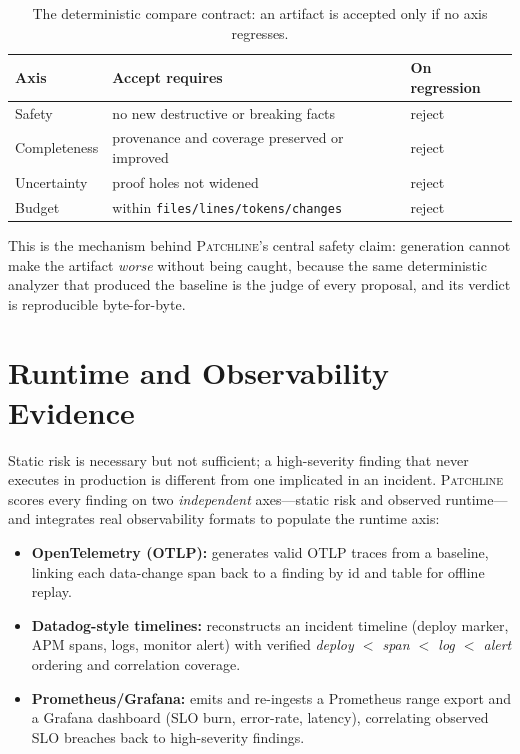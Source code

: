 \documentclass[11pt]{article}
\newcommand{\tool}{\textsc{Patchline}}
\newcommand{\code}[1]{\texttt{#1}}
\begin{document}
\begin{table}[h]\centering\small
\caption{The deterministic compare contract: an artifact is accepted only if no axis regresses.}
\label{tab:compare}
\begin{tabular}{>{\raggedright\arraybackslash}p{3.2cm}>{\raggedright\arraybackslash}p{6.4cm}>{\raggedright\arraybackslash}p{3.4cm}}
\toprule
\textbf{Axis} & \textbf{Accept requires} & \textbf{On regression} \\
\midrule
Safety & no new destructive or breaking facts & reject \\
Completeness & provenance and coverage preserved or improved & reject \\
Uncertainty & proof holes not widened & reject \\
Budget & within \code{files/lines/tokens/changes} & reject \\
\bottomrule
\end{tabular}
\end{table}

\noindent
This is the mechanism behind \tool's central safety claim: generation cannot make the artifact
\emph{worse} without being caught, because the same deterministic analyzer that produced the baseline
is the judge of every proposal, and its verdict is reproducible byte-for-byte.

\section{Runtime and Observability Evidence}
\label{sec:runtime}

Static risk is necessary but not sufficient; a high-severity finding that never executes in
production is different from one implicated in an incident. \tool{} scores every finding on two
\emph{independent} axes---static risk and observed runtime---and integrates real observability
formats to populate the runtime axis:

\begin{itemize}[leftmargin=1.4em]
  \item \textbf{OpenTelemetry (OTLP):} generates valid OTLP traces from a baseline, linking each
  data-change span back to a finding by id and table for offline replay.
  \item \textbf{Datadog-style timelines:} reconstructs an incident timeline (deploy marker, APM
  spans, logs, monitor alert) with verified \emph{deploy $<$ span $<$ log $<$ alert} ordering and
  correlation coverage.
  \item \textbf{Prometheus/Grafana:} emits and re-ingests a Prometheus range export and a Grafana
  dashboard (SLO burn, error-rate, latency), correlating observed SLO breaches back to high-severity
  findings.
\end{itemize}
\end{document}
